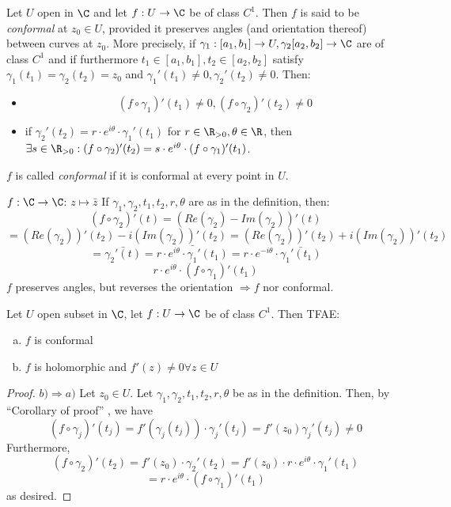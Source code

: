 \begin{definition}
  Let $U$ open in $\C$ and let $f:U\to \C$ be of class $C^1$. Then $f$ is said to be \emph{conformal} at $z_0\in U$, provided it preserves angles (and orientation thereof) between curves at $z_0$. More precisely, if $\gamma_1:[a_1,b_1]\to U, \gamma_2[a_2,b_2]\to \C$ are of class $C^1$ and if furthermore $t_1\in [a_1,b_1], t_2\in [a_2,b_2]$
  satisfy $\gamma_1(t_1)=\gamma_2(t_2)=z_0$ and $\gamma_1'(t_1)\neq 0, \gamma_2'(t_2)\neq 0$. Then:
  \begin{itemize}
    \item
      $$(f\circ \gamma_1)'(t_1)\neq 0, (f\circ \gamma_2)'(t_2)\neq 0$$
    \item
      if $\gamma_2'(t_2)=r\cdot e^{i\theta}\cdot \gamma_1'(t_1)$ for $r\in\R_{>0},\theta \in \R$, then $\exists s\in \R_{>0}: (f\circ \gamma_2)'(t_2)=s\cdot e^{i\theta}\cdot (f\circ\gamma_1)'(t_1)$.
  \end{itemize}
  $f$ is called \emph{conformal} if it is conformal at every point in $U$.
\end{definition}

\begin{example}
  $f:\C\to \C$: $z\mapsto \bar{z}$
  \newline If $\gamma_1,\gamma_2,t_1,t_2, r, \theta $ are as in the definition, then:
      $$\left(f\circ \gamma_2\right)'(t)=\left(Re(\gamma_2)-Im(\gamma_2)\right)'(t)$$
      $$=\left(Re(\gamma_2)\right)'(t_2)-i \left(Im(\gamma_2)\right) '(t_2)= \left(Re(\gamma_2)\right) '(t_2)+ i \left(Im(\gamma_2)\right) '(t_2)$$
      $$=\bar{\gamma_2'(t)}=\bar{r\cdot e^{i\theta}\cdot\gamma_1'(t_1)}=r\cdot e^{-i\theta}\cdot \bar{\gamma_1'(t_1)}$$
      $$r\cdot e^{i\theta}\cdot \left(f\circ \gamma_1\right)'(t_1)$$
    $f$ preserves angles, but reverses the orientation $\Rightarrow f$ nor conformal.
\end{example}

\begin{proposition}
  Let $U$ open subset in $\C$, let $f:U\to \C$ be of class $C^1$. Then TFAE:
    \begin{enumerate}[(a)]
      \item $f$ is conformal
      \item $f$ is holomorphic and $f'(z)\neq 0 \forall z\in U$
    \end{enumerate}
\end{proposition}
\begin{proof}
  $b)\Rightarrow a)$ Let $z_0 \in U$. Let $\gamma_1,\gamma_2,t_1,t_2,r,\theta$ be as in the definition. Then, by ``Corollary of proof'' %
  , we have
      $$\left(f\circ \gamma_j\right)'(t_j)=f'\left(\gamma_j(t_j)\right) \cdot\gamma_j'(t_j)=f'\left(z_0\right)\gamma_j'(t_j)\neq 0$$
    Furthermore,
      $$\left(f\circ \gamma_2\right)'(t_2)=f'(z_0) \cdot \gamma_2'(t_2)=f'(z_0) \cdot r \cdot e^{i\theta} \cdot \gamma_1'(t_1)$$
      $$=r \cdot e^{i\theta} \cdot \left(f\circ \gamma_1\right)'(t_1)$$
      as desired.
\end{proof}

